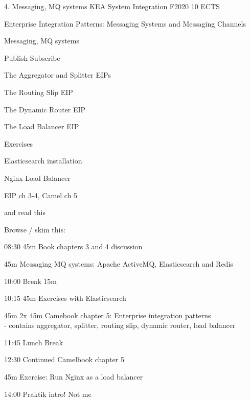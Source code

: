 \documentclass[Screen16to9,17pt]{foils}
\begin{document}
\mytitlepage
{4. Messaging, MQ systems}
{KEA System Integration F2020 10 ECTS}


\begin{list2}
\item Enterprise Integration Patterns: Messaging Systems and Messaging Channels
\item Messaging, MQ systems
\item Publish-Subscribe
\item The Aggregator and Splitter EIPs
\item The Routing Slip EIP
\item The Dynamic Router EIP
\item The Load Balancer EIP
\end{list2}

Exercises
\begin{list2}
\item Elasticsearch installation
\item Nginx Load Balancer
\end{list2}




\begin{list1}
\item EIP ch 3-4, Camel ch 5

and read this\\

\item Browse / skim this:\\

\end{list1}



\begin{list2}
\item 08:30 45m Book chapters 3 and 4 discussion
\item 45m Messaging MQ systems: Apache ActiveMQ, Elasticsearch and Redis
\item 10:00 Break 15m
\item 10:15 45m Exercises with Elasticsearch
\item 45m 2x 45m Camebook chapter 5: Enterprise integration patterns\\
 - contains aggregator, splitter, routing slip, dynamic router, load balancer
\item 11:45 Lunch Break
\item 12:30 Continued Camelbook chapter 5
\item 45m Exercise: Run Nginx as a load balancer
\item 14:00 Praktik intro! Not me
\end{list2}
\end{document}

